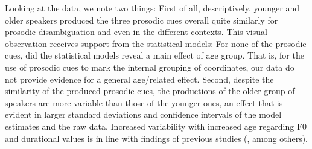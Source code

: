 \documentclass[output=paper]{langscibook}
\begin{document}
Looking at the data, we note two things: First of all, descriptively, younger and older speakers produced the three prosodic cues overall quite similarly for prosodic disambiguation and even in the different contexts. This visual observation receives support from the statistical models: For none of the prosodic cues, did the statistical models reveal a main effect of age group. That is, for the use of prosodic cues to mark the internal grouping of coordinates, our data do not provide evidence for a general age\-/related effect. Second, despite the similarity of the produced prosodic cues, the productions of the older group of speakers are more variable than those of the younger ones, an effect that is evident in larger standard deviations and confidence intervals of the model estimates and the raw data. Increased variability with increased age regarding F0 and durational values is in line with findings of previous studies (\citealt{scukanec_etal1992, scukanec_etal1996, lortie2015_age-effects, santos_etal2021}, among others).
\end{document}
